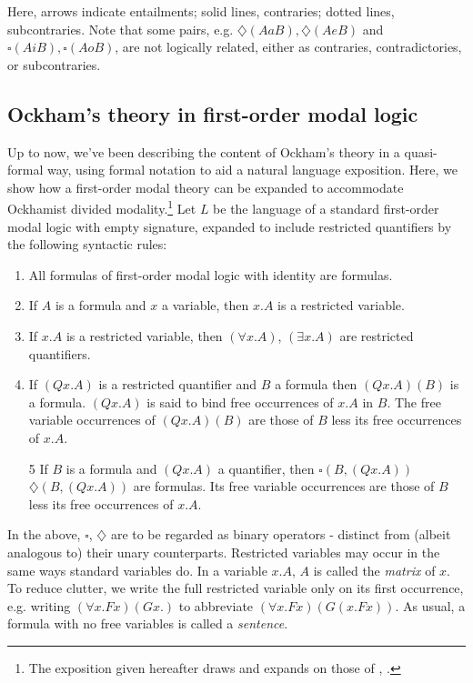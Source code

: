 \documentclass[]{article}
\begin{document}
Here, arrows indicate entailments; solid lines, contraries; dotted lines, subcontraries. Note that some pairs, e.g. $\diamondsuit(AaB), \diamondsuit(AeB)$ and $\square(AiB), \square(AoB)$, are not logically related, either as contraries, contradictories, or subcontraries.
\subsection{Ockham's theory in first-order modal logic}
Up to now, we've been describing the content of Ockham's theory in a quasi-formal way, using formal notation to aid a natural language exposition. Here, we show how a first-order modal theory can be expanded to accommodate Ockhamist divided modality.\footnote{The exposition given hereafter draws and expands on those of \cite{Klima1988}, \cite{Klima2001}.} Let $L$ be the language of a standard first-order modal logic with empty signature, expanded to include restricted quantifiers by the following syntactic rules: 
\begin{enumerate}
	\item All formulas of first-order modal logic with identity are formulas.
	\item If $A$ is a formula and $x$ a variable, then $x.A$ is a restricted variable. 
	\item If $x.A$ is a restricted variable, then $(\forall x.A)$, $(\exists x.A)$ are restricted quantifiers. 
	\item If $(Qx.A)$ is a restricted quantifier and $B$ a formula then $(Qx.A)(B)$ is a formula. $(Qx.A)$ is said to bind free occurrences of $x.A$ in $B$. The free variable occurrences of $(Qx.A)(B)$ are those of $B$ less its free occurrences of $x.A$.
	\item[5] If $B$ is a formula and $(Qx.A)$ a quantifier, then $\square(B, (Qx.A))$ $\diamondsuit(B, (Qx.A))$ are formulas. Its free variable occurrences are those of $B$ less its free occurrences of $x.A$.
\end{enumerate}

In the above, $\square$, $\diamondsuit$ are to be regarded as binary operators  - distinct from (albeit analogous to) their unary counterparts. Restricted variables may occur in the same ways standard variables do. In a variable $x.A$, $A$ is called the \textit{matrix} of $x$. To reduce clutter, we write the full restricted variable only on its first occurrence, e.g. writing $(\forall x.Fx)(Gx.)$ to abbreviate $(\forall x.Fx)(G(x.Fx))$. As usual, a formula with no free variables is called a \textit{sentence}. 
\end{document}
